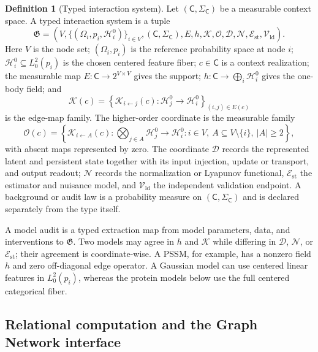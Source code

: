 \documentclass[10pt]{article}
\theoremstyle{definition}
\newtheorem{definition}[theorem]{Definition}
\theoremstyle{remark}
\newcommand{\BookSection}[1]{\subsection{#1}}
\begin{document}
\begin{definition}[Typed interaction system]
Let $(\mathsf C,\Sigma_{\mathsf C})$ be a measurable context space.  A typed interaction system is
a tuple
\begin{equation}
\mathfrak G=
\left(V,\{(\Omega_i,p_i,\mathcal H_i^0)\}_{i\in V},(\mathsf C,\Sigma_{\mathsf C}),
E,h,\mathcal K,\mathcal O,\mathcal D,\mathcal N,\mathcal E_{\mathrm{st}},
\mathcal V_{\!\mathrm{ld}}\right).
\label{eq:typed-system}
\end{equation}
Here $V$ is the node set; $(\Omega_i,p_i)$ is the reference probability space at node $i$;
$\mathcal H_i^0\subseteq L_0^2(p_i)$ is the chosen centered feature fiber; $c\in\mathsf C$ is a
context realization; the measurable map $E:\mathsf C\to2^{V\times V}$ gives the support;
$h:\mathsf C\to\bigoplus_i\mathcal H_i^0$ gives the one-body field; and
\[
\mathcal K(c)=
\left\{
\mathcal K_{i\leftarrow j}(c):\mathcal H_j^0\longrightarrow\mathcal H_i^0
\right\}_{(i,j)\in E(c)}
\]
is the edge-map family.  The higher-order coordinate is the measurable family
\[
\mathcal O(c)=
\left\{
\mathcal K_{i\leftarrow A}(c):
\bigotimes_{j\in A}\mathcal H_j^0\longrightarrow\mathcal H_i^0
:i\in V,\ A\subseteq V\setminus\{i\},\ |A|\geq2
\right\},
\]
with absent maps represented by zero.  The coordinate $\mathcal D$ records the represented latent and
persistent state together with its input injection, update or transport, and output readout;
$\mathcal N$ records the normalization or Lyapunov functional, $\mathcal E_{\mathrm{st}}$ the
estimator and nuisance model, and $\mathcal V_{\!\mathrm{ld}}$ the independent validation endpoint.
A background or audit law is a probability measure on $(\mathsf C,\Sigma_{\mathsf C})$ and is
declared separately from the type itself.
\end{definition}

A model audit is a typed extraction map from model parameters, data, and interventions to
$\mathfrak G$.  Two models may agree in $h$ and $\mathcal K$ while differing in $\mathcal D$,
$\mathcal N$, or $\mathcal E_{\mathrm{st}}$; their agreement is coordinate-wise.  A PSSM, for
example, has a nonzero field $h$ and zero off-diagonal edge operator.  A
Gaussian model can use centered linear features in $L_0^2(p_i)$, whereas the protein models below
use the full centered categorical fiber.

\BookSection{Relational computation and the Graph Network interface}
\end{document}
